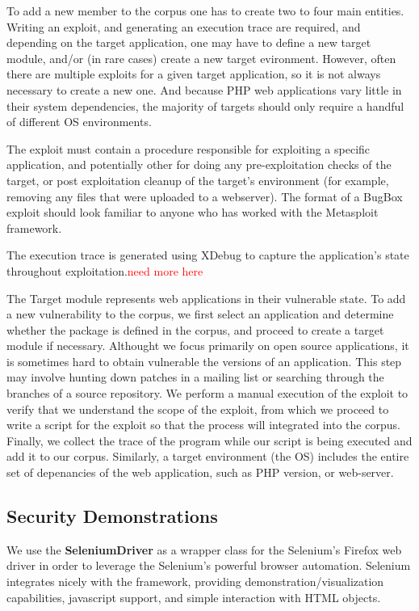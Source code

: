 \documentclass[letterpaper,twocolumn,10pt]{article}
\begin{document}
To add a new member to the corpus one has to create two to four main entities. Writing an exploit, and generating an execution trace are required, and depending on the target application, one may have to define a new target module, and/or (in rare cases) create a new target evironment. However, often there are multiple exploits for a given target application, so it is not always necessary to create a new one. And because PHP web applications vary little in their system dependencies, the majority of targets should only require a handful of different OS environments. \par
The exploit must contain a procedure responsible for exploiting a specific application, and potentially other for doing any pre-exploitation checks of the target, or post exploitation cleanup of the target's environment (for example, removing any files that were uploaded to a webserver). The format of a BugBox exploit should look familiar to anyone who has worked with the Metasploit framework.\par
The execution trace is generated using XDebug to capture the application's state throughout exploitation.\textcolor{red} {need more here}\par 
The Target module represents web applications in their vulnerable state. To add a new vulnerability to the corpus, we first select an application and determine whether the package is defined in the corpus, and proceed to create a target module if necessary. Althought we focus primarily on open source applications, it is sometimes hard to obtain vulnerable the versions of an application. This step may involve hunting down patches in a mailing list or searching through the branches of a source repository. We perform a manual execution of the exploit to verify that we understand the scope of the exploit, from which we proceed to write a script for the exploit so that the process will integrated into the corpus. Finally, we collect the trace of the program while our script is being executed and add it to our corpus. Similarly, a target environment (the OS) includes the entire set of depenancies of the web application, such as PHP version, or web-server.\par


\subsection{Security Demonstrations}
We use the {\bf SeleniumDriver} as a wrapper class for the Selenium's Firefox web driver in order to leverage the Selenium's powerful browser automation.  Selenium integrates nicely with the framework, providing demonstration/visualization capabilities, javascript support, and simple interaction with HTML objects.
\end{document}
